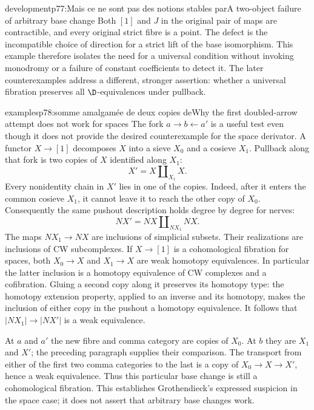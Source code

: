 \begin{dcomment}{development}{p77:Mais ce ne sont pas des notions stables par}{A two-object failure of arbitrary base change}
Both $[1]$ and $J$ in the original pair of maps are contractible, and every original strict fibre is a point. The defect is the incompatible choice of direction for a strict lift of the base isomorphism. This example therefore isolates the need for a universal condition without invoking monodromy or a failure of constant coefficients to detect it. The later counterexamples address a different, stronger assertion: whether a universal fibration preserves all $\D$-equivalences under pullback.
\end{dcomment}

\begin{dcomment}{examples}{p78:somme amalgamée de deux copies de}{Why the first doubled-arrow attempt does not work for spaces}
The fork $a\to b\leftarrow a'$ is a useful test even though it does not provide the desired counterexample for the space derivator. A functor $X\to[1]$ decomposes $X$ into a sieve $X_0$ and a cosieve $X_1$. Pullback along that fork is two copies of $X$ identified along $X_1$:
\[
 X'=X\amalg_{X_1}X.
\]
Every nonidentity chain in $X'$ lies in one of the copies. Indeed, after it enters the common cosieve $X_1$, it cannot leave it to reach the other copy of $X_0$. Consequently the same pushout description holds degree by degree for nerves:
\[
 NX'=NX\amalg_{NX_1}NX.
\]
The maps $NX_1\to NX$ are inclusions of simplicial subsets. Their realizations are inclusions of CW subcomplexes. If $X\to[1]$ is a cohomological fibration for spaces, both $X_0\to X$ and $X_1\to X$ are weak homotopy equivalences. In particular the latter inclusion is a homotopy equivalence of CW complexes and a cofibration. Gluing a second copy along it preserves its homotopy type: the homotopy extension property, applied to an inverse and its homotopy, makes the inclusion of either copy in the pushout a homotopy equivalence. It follows that $|NX_1|\to|NX'|$ is a weak equivalence.

At $a$ and $a'$ the new fibre and comma category are copies of $X_0$. At $b$ they are $X_1$ and $X'$; the preceding paragraph supplies their comparison. The transport from either of the first two comma categories to the last is a copy of $X_0\to X\to X'$, hence a weak equivalence. Thus this particular base change is still a cohomological fibration. This establishes Grothendieck's expressed suspicion in the space case; it does not assert that arbitrary base changes work.
\end{dcomment}

